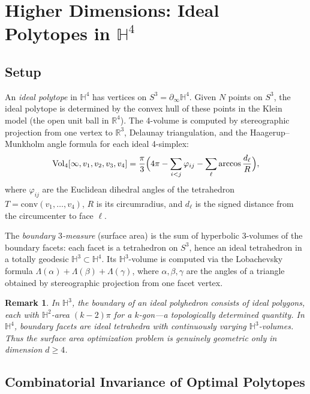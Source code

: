 \documentclass[11pt]{article}
\newtheorem{remark}{Remark}
\begin{document}
\section{Higher Dimensions: Ideal Polytopes in $\mathbb{H}^4$}
\label{sec:H4}

\subsection{Setup}

An \emph{ideal polytope} in $\mathbb{H}^4$ has vertices on $S^3 = \partial_\infty \mathbb{H}^4$.
Given $N$ points on $S^3$, the ideal polytope is determined by the convex hull
of these points in the Klein model (the open unit ball in $\mathbb{R}^4$).
The 4-volume is computed by stereographic projection from one vertex to $\mathbb{R}^3$,
Delaunay triangulation, and the Haagerup--Munkholm angle formula for each ideal 4-simplex:
\[
\mathrm{Vol}_4[\infty, v_1, v_2, v_3, v_4]
= \frac{\pi}{3}\Bigl(4\pi - \sum_{i<j}\varphi_{ij} - \sum_\ell \arccos\frac{d_\ell}{R}\Bigr),
\]
where $\varphi_{ij}$ are the Euclidean dihedral angles of the tetrahedron
$T = \mathrm{conv}(v_1,\ldots,v_4)$, $R$ is its circumradius, and $d_\ell$
is the signed distance from the circumcenter to face $\ell$.

The \emph{boundary $3$-measure} (surface area) is the sum of hyperbolic
3-volumes of the boundary facets: each facet is a tetrahedron on $S^3$,
hence an ideal tetrahedron in a totally geodesic $\mathbb{H}^3 \subset \mathbb{H}^4$.
Its $\mathbb{H}^3$-volume is computed via the Lobachevsky formula
$\Lambda(\alpha) + \Lambda(\beta) + \Lambda(\gamma)$, where $\alpha,\beta,\gamma$
are the angles of a triangle obtained by stereographic projection from one
facet vertex.

\begin{remark}
In $\mathbb{H}^3$, the boundary of an ideal polyhedron consists of ideal
polygons, each with $\mathbb{H}^2$-area $(k-2)\pi$ for a $k$-gon---a
topologically determined quantity. In $\mathbb{H}^4$, boundary facets are ideal
tetrahedra with continuously varying $\mathbb{H}^3$-volumes. Thus the surface
area optimization problem is genuinely geometric only in dimension $d \geq 4$.
\end{remark}

\subsection{Combinatorial Invariance of Optimal Polytopes}
\end{document}
